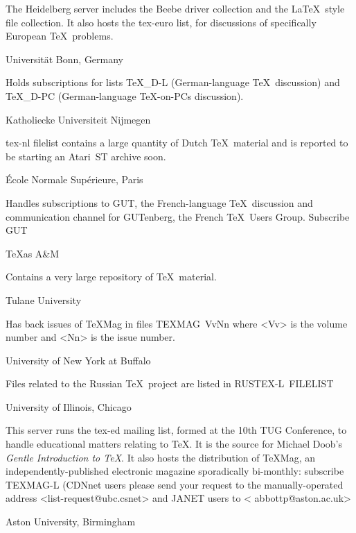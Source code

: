      The Heidelberg server includes the Beebe driver collection and the
     \LaTeX\ style file collection. It also hosts the {\tx tex-euro}
     list, for discussions of specifically European \TeX\ problems.

 {Universit\"at Bonn, Germany}

     Holds subscriptions for lists {\tx\TeX\_D-L} (German-language
     \TeX\ discussion) and {\tx\TeX\_D-PC} (German-language \TeX-on-PCs
     discussion).

 {Katholiecke Universiteit Nijmegen}

{\tx tex-nl filelist} contains a large quantity of Dutch \TeX\ material
     and is reported to be starting an Atari~ST archive soon.

 {\'Ecole Normale Sup\'erieure, Paris}

     Handles subscriptions to GUT, the French-language \TeX\ discussion
     and communication channel for GUTenberg, the French \TeX\ Users
     Group. Subscribe {\tx GUT}

 {\TeX as A\&M}

     Contains a very large repository of \TeX\ material.

 {Tulane University}

     Has back issues of \TeX Mag in files {\tx TEXMAG~VvNn} where
     <{\tx Vv}> is the volume number and <{\tx Nn}> is the issue number.

 {University of New York at Buffalo}

     Files related to the Russian \TeX\ project are listed in {\tx
     RUSTEX-L~FILELIST}

 {University of Illinois, Chicago}

     This server runs the {\tx tex-ed} mailing list, formed at the 10th
     TUG Conference, to handle educational matters relating to \TeX. It
     is the source for Michael Doob's {\it Gentle Introduction to
     \TeX}.\nl
     It also hosts the distribution of \TeX Mag, an
     independently-published electronic magazine sporadically
     bi-monthly: subscribe {\tx TEXMAG-L} (CDNnet users please send
     your request to the manually-operated address
     <{\tx list-request@ubc.csnet}> and JANET users to <{\tx
     abbottp@aston.ac.uk}>

 {Aston University, Birmingham}

